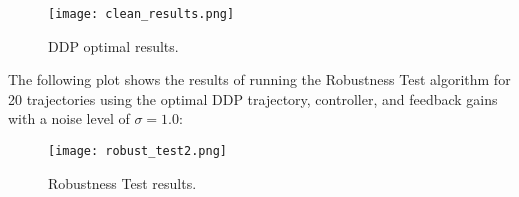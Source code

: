 \documentclass[11pt]{homework}
\begin{document}
\begin{arabicparts}
		\begin{figure}[H]
			\centering
			\texttt{[image: clean\_results.png]}
			\caption{DDP optimal results.}
		\end{figure}
		
	The following plot shows the results of running the Robustness Test algorithm for 20 trajectories using the optimal DDP trajectory, controller, and feedback gains with a noise level of $\sigma = 1.0$:
	
		\begin{figure}[H]
			\centering
			\texttt{[image: robust\_test2.png]}
			\caption{Robustness Test results.}
		\end{figure}

\end{arabicparts}

	
\end{document}
